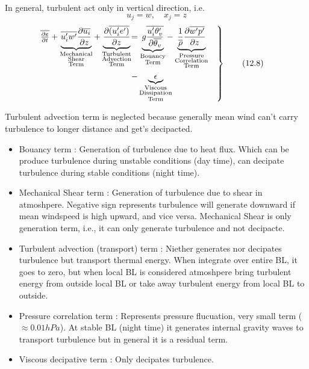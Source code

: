 \documentclass[fleqn,10pt]{SelfArx} %
\begin{document}
In general, turbulent act only in vertical direction, i.e. \[u_j = w, \quad x_j = z \]
\begin{align}
	\begin{rcases}
		\mspace{-21mu} \overline{\frac{\partial e}{\partial t}} 
		+ \underbrace{\overline{u_i' w'}\frac{\partial \overline{u_i}}{\partial z}}_{\substack{\text{Mechanical} \\ \text{Shear} \\ \text{Term}}}
		+ \underbrace{\frac{\partial \overline{(u_i' e')}}{\partial z}}_{\substack{\text{Turbulent} \\ \text{Advection} \\ \text{Term}}} \!\!\!\!\!\! &= \underbrace{g \overline{\frac{u_i' \theta_v'}{\partial \overline{\theta_v}}}}_{\substack{\text{Bouancy} \\ \text{Term}}}
		- \underbrace{\frac{1}{\overline{\rho}}\frac{\partial \overline{w' p'}}{\partial z}}_{\substack{\text{Pressure} \\ \text{Correlation} \\ \text{Term}}} \quad\\
		&- \underbrace{\epsilon}_{\substack{\text{Viscous} \\ \text{Dissipation} \\ \text{Term}}}
	\end{rcases}
	\tag{12.8} \label{eq:12.8}
\end{align}

Turbulent advection term is neglected because generally mean wind can't carry turbulence to longer distance and get's decipacted.

\begin{itemize}[noitemsep]
	\item Bouancy term : Generation of turbulence due to heat flux. Which can be produce turbulence during unstable conditions (day time), can decipate turbulence during stable conditions (night time).
	\item Mechanical Shear term : Generation of turbulence due to shear in atmoshpere. Negative sign represents turbulence will generate downward if mean windspeed is high upward, and vice versa. Mechanical Shear is only generation term, i.e., it can only generate turbulence and not decipacte.
	\item Turbulent advection (transport) term : Niether generates nor decipates turbulence but transport thermal energy. When integrate over entire BL, it goes to zero, but when local BL is considered atmoshpere bring turbulent energy from outside local BL or take away turbulent energy from local BL to outside.
	\item Pressure correlation term : Represents pressure flucuation, very small term (\( \approx 0.01 hPa \)). At stable BL (night time) it generates internal gravity waves to transport turbulence but in general it is a residual term.
	\item Viscous decipative term : Only decipates turbulence.
\end{itemize}
\end{document}
